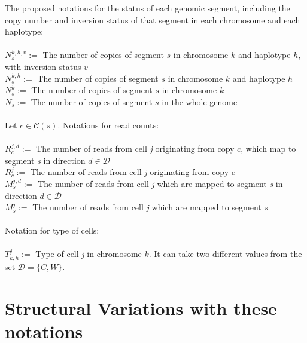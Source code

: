 \documentclass[12pt]{article}
\renewcommand{\c}{c} %
\newcommand{\C}{\mathcal{C}} %
\newcommand{\CN}{N} %
\renewcommand{\i}{v} %
\newcommand{\RC}{R} %
\newcommand{\MC}{M} %
\renewcommand{\d}{d} %
\newcommand{\D}{\mathcal{D}} %
\newcommand{\Crick}{C}
\newcommand{\Watson}{W}
\newcommand{\chr}{k}
\newcommand{\h}{h} %
\newcommand{\T}{T} %
\begin{document}
The proposed notations for the status of each genomic segment, including the copy number and inversion status of that segment in each chromosome and each haplotype:\\ \\
$\CN_s^{\chr,\h,\i} := $ The number of copies of segment $s$ in chromosome $\chr$ and haplotype $\h$, with inversion status $\i$ \\
$\CN_s^{\chr,\h} := $ The number of copies of segment $s$ in chromosome $\chr$ and haplotype $\h$ \\
$\CN_s^\chr := $ The number of copies of segment $s$ in chromosome $\chr$\\
$\CN_s := $ The number of copies of segment $s$ in the whole genome \\ \\
Let $\c \in \C(s)$. Notations for read counts:\\ \\
$\RC_\c^{j,\d} := $ The number of reads from cell \textit{j} originating from copy $\c$, which map to segment \textit{s} in direction $\d \in \D$\\
$\RC_\c^j := $ The number of reads from cell \textit{j} originating from copy $\c$ \\
$\MC_s^{j,\d} := $ The number of reads from cell \textit{j} which are mapped to segment \textit{s} in direction $\d \in \D$\\
$\MC_s^j := $ The number of reads from cell \textit{j} which are mapped to segment \textit{s}\\ \\
Notation for type of cells:\\ \\
$\T_{\chr,\h}^j := $ Type of cell \textit{j} in chromosome $\chr$. It can take two different values from the set $\D = \{\Crick,\Watson\}$.\\

\section{Structural Variations with these notations}
\end{document}
